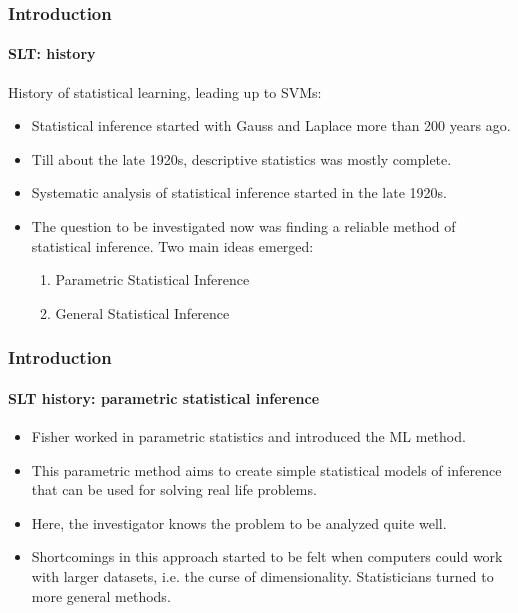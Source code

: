 \begin{frame}
\frametitle{Introduction}
\framesubtitle{SLT: history}
\logoCSIPCPL\mypagenum
History of statistical learning, leading up to SVMs:
	\begin{itemize}
		\item Statistical inference started with Gauss and Laplace more than 200 years ago.
		\item Till about the late 1920s, descriptive statistics was mostly complete.
		\item Systematic analysis of statistical inference started in the late 1920s.
		\item The question to be investigated now was finding a reliable method of statistical inference.  Two main ideas emerged:
			\begin{enumerate}
				\item Parametric Statistical Inference
				\item General Statistical Inference
			\end{enumerate}
	\end{itemize}
\end{frame}  



\begin{frame}
\frametitle{Introduction}
\framesubtitle{SLT history: parametric statistical inference}
\logoCSIPCPL\mypagenum
	\begin{itemize}
		\item Fisher worked in parametric statistics and introduced the ML method.  
		\item This parametric method aims to create simple statistical models of inference that can be used for solving real life problems.  
		\item Here, the investigator knows the problem to be analyzed quite well.  
		\item Shortcomings in this approach started to be felt when computers could work with larger datasets, i.e. the curse of dimensionality.  Statisticians turned to more general methods.
	\end{itemize}
\end{frame}


